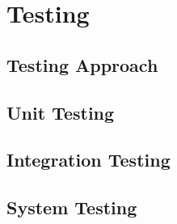 \section{Testing}

\subsection{Testing Approach}

\subsection{Unit Testing}


\subsection{Integration Testing}

\subsection{System Testing}

